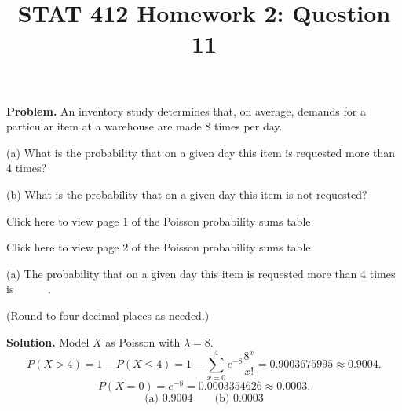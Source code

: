 \documentclass[11pt]{article}
\title{STAT 412 Homework 2: Question 11}
\author{}
\date{}
\begin{document}
\maketitle
\textbf{Problem.} An inventory study determines that, on average, demands for a
particular item at a warehouse are made 8 times per day.

(a) What is the probability that on a given day this item is requested more
than 4 times?

(b) What is the probability that on a given day this item is not requested?

Click here to view page 1 of the Poisson probability sums table.

Click here to view page 2 of the Poisson probability sums table.

(a) The probability that on a given day this item is requested more than 4
times is \(\boxed{\phantom{0.0000}}\).

(Round to four decimal places as needed.)

\textbf{Solution.} Model \(X\) as Poisson with \(\lambda=8\).
\[
P(X>4)=1-P(X\le4)
=1-\sum_{x=0}^{4}e^{-8}\frac{8^x}{x!}
=0.9003675995\approx0.9004.
\]
\[
P(X=0)=e^{-8}=0.0003354626\approx0.0003.
\]
\[
\boxed{\text{(a) }0.9004\qquad\text{(b) }0.0003}
\]
\end{document}

